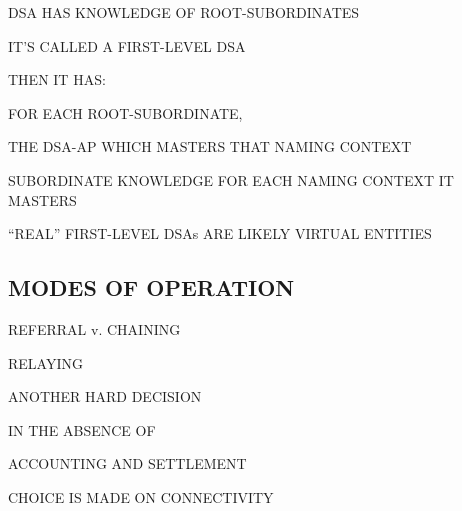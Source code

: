 \begin{bwslide}

\begin{nrtc}
\item	DSA HAS KNOWLEDGE OF ROOT-SUBORDINATES
    \begin{nrtc}
    \item	IT'S CALLED A FIRST-LEVEL DSA
    \end{nrtc}
    THEN IT HAS:

\item	FOR EACH ROOT-SUBORDINATE,
    \begin{nrtc}
    \item	THE DSA-AP WHICH MASTERS THAT NAMING CONTEXT
    \end{nrtc}

\item	SUBORDINATE KNOWLEDGE FOR EACH NAMING CONTEXT IT MASTERS

\item	``REAL'' FIRST-LEVEL DSAs ARE LIKELY VIRTUAL ENTITIES
\end{nrtc}
\end{bwslide}


\begin{bwslide}
\part*	{MODES OF OPERATION}\bf

\begin{nrtc}
\item	REFERRAL v. CHAINING

\item	RELAYING
\end{nrtc}
\end{bwslide}


\begin{bwslide}

\begin{nrtc}
\item	ANOTHER HARD DECISION

\item	IN THE ABSENCE OF
    \begin{nrtc}
    \item	ACCOUNTING AND SETTLEMENT
    \end{nrtc}
	CHOICE IS MADE ON CONNECTIVITY
\end{nrtc}
\end{bwslide}



